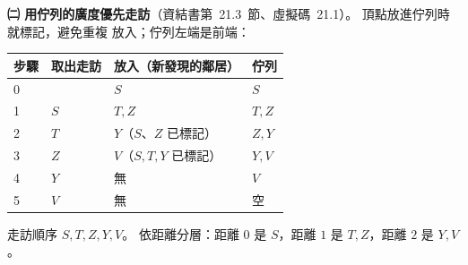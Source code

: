 \begin{pastsoln}
\textbf{㈡ 用佇列的廣度優先走訪}（資結書第~21.3~節、虛擬碼~21.1）。 頂點放進佇列時就標記，避免重複
放入；佇列左端是前端：
\begin{center}
\begin{tabular}{llll}
\toprule
步驟 & 取出走訪 & 放入（新發現的鄰居） & 佇列 \\
\midrule
0 & & $S$ & $S$ \\
1 & $S$ & $T, Z$ & $T, Z$ \\
2 & $T$ & $Y$（$S$、$Z$ 已標記） & $Z, Y$ \\
3 & $Z$ & $V$（$S, T, Y$ 已標記） & $Y, V$ \\
4 & $Y$ & 無 & $V$ \\
5 & $V$ & 無 & 空 \\
\bottomrule
\end{tabular}
\end{center}
走訪順序 $S, T, Z, Y, V$。 依距離分層：距離 $0$ 是 $S$，距離 $1$ 是 $T, Z$，距離 $2$ 是 $Y, V$。
\end{pastsoln}
